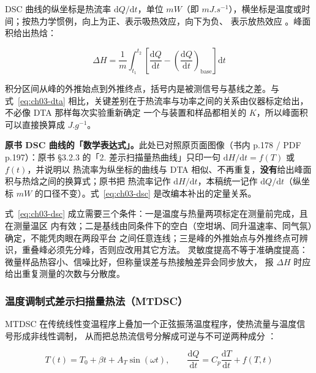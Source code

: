 DSC 曲线的纵坐标是热流率 $\mathrm{d}Q/\mathrm{d}t$，单位 $\unit{mW}$（即
$\unit{mJ.s^{-1}}$），横坐标是温度或时间；按热力学惯例，向上为正、表示吸热效应，向下为负、
表示放热效应 。峰面积给出热焓：

\begin{equation}\label{eq:ch03-dsc}
\Delta H=\frac{1}{m}\int_{t_1}^{t_2}
\left[\frac{\mathrm{d}Q}{\mathrm{d}t}
-\left(\frac{\mathrm{d}Q}{\mathrm{d}t}\right)_{\mathrm{base}}\right]\mathrm{d}t
\end{equation}

积分区间从峰的外推始点到外推终点，括号内是被测信号与基线之差。与式~\eqref{eq:ch03-dta}
相比，关键差别在于热流率与功率之间的关系由仪器标定给出，不必像 DTA 那样每次实验重新确定
一个与装置和样品都相关的 $K$，所以峰面积可以直接换算成 $\unit{J.g^{-1}}$。

\textbf{原书 DSC 曲线的「数学表达式」。}此处已对照原页面图像（书内 p.178 / PDF p.197）：原书
§3.2.3 的「2. 差示扫描量热曲线」只印一句 $\mathrm{d}H/\mathrm{d}t=f(T)$ 或 $f(t)$，并说明以
热流率为纵坐标的曲线与 DTA 相似、不再重复，\textbf{没有}给出峰面积与热焓之间的换算式；原书把
热流率记作 $\mathrm{d}H/\mathrm{d}t$，本稿统一记作 $\mathrm{d}Q/\mathrm{d}t$（纵坐标
$\unit{mW}$ 的口径不变）。式~\eqref{eq:ch03-dsc} 是改编本补出的定量关系。

\begin{keycond}
式~\eqref{eq:ch03-dsc} 成立需要三个条件：一是温度与热量两项标定在测量前完成，且在测量温区
内有效；二是基线由同条件下的空白（空坩埚、同升温速率、同气氛）确定，不能凭肉眼在两段平台
之间任意连线；三是峰的外推始点与外推终点可辨识，重叠峰必须先分峰，否则应改用其它方法。
灵敏度提高不等于准确度提高：微量样品热容小、信噪比好，但称量误差与热接触差异会同步放大，
报 $\Delta H$ 时应给出重复测量的次数与分散度。
\end{keycond}

\subsubsection{温度调制式差示扫描量热法（MTDSC）}

MTDSC 在传统线性变温程序上叠加一个正弦振荡温度程序，使热流量与温度信号形成非线性调制，
从而把总热流信号分解成可逆与不可逆两种成分 ：

\begin{equation}\label{eq:ch03-mtdsc}
T(t)=T_0+\beta t+A_T\sin(\omega t),\qquad
\frac{\mathrm{d}Q}{\mathrm{d}t}=C_p\frac{\mathrm{d}T}{\mathrm{d}t}+f(T,t)
\end{equation}

